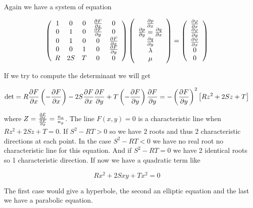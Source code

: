 Again we have a system of equation

\begin{equation}
\left( 
\begin{array}{ccccc}
1 & 0 & 0 & \frac{\partial F}{\partial x} & 0\\
0 & 1 & 0 & \frac{\partial F}{\partial y} & 0 \\
0 & 1 & 0 & 0 & \frac{\partial F}{\partial x} \\
0 & 0 & 1 & 0 & \frac{\partial F}{\partial y} \\
R & 2S & T & 0 & 0
\end{array}
\right)
\left( 
\begin{array}{c}
\frac{\partial p}{\partial x} \\
\frac{\partial p}{\partial y} = \frac{\partial q}{\partial x}\\
\frac{\partial q }{\partial y}\\
\lambda\\
\mu 
\end{array}
\right)
=
\left( 
\begin{array}{c}
\frac{\partial \varphi}{\partial x} \\
\frac{\partial \varphi}{\partial y} \\
\frac{\partial \psi}{\partial x}\\
0\\
0
\end{array}
\right)
\end{equation}

If we try to compute the determinant we will get 

\begin{equation}
\det = R \frac{\partial F}{\partial x} \left( - \frac{\partial F}{\partial x} \right) - 2 S \frac{\partial F}{\partial x}\frac{\partial F}{\partial y}  +T \left( -\frac{\partial F}{\partial y}\right)\frac{\partial F}{\partial y} = - \left(\frac{\partial F}{\partial y}\right) ^2 \left[ Rz^2 + 2 Sz 
+ T \right]
\end{equation}

where $Z = \frac{\frac{\partial F}{\partial x}}{\frac{\partial F}{\partial y}} = \frac{n_x}{n_y}$. The line $F(x,y) = 0$ is a characteristic line when $Rz^2 + 2Sz + T = 0$. If $S^2 - RT > 0$ so we have 2 roots and thus 2 characteristic directions at each point. In the case $S^2 - RT < 0$ we have no real root no characteristic line for this equation. And if $S^2 - RT = 0$ we have 2 identical roots so 1 characteristic direction. If now we have a quadratic term like 

\begin{equation}
R x^2 + 2S xy + Tx^2 = 0
\end{equation}

The first case would give a hyperbole, the second an elliptic equation and the last we have a parabolic equation. 

